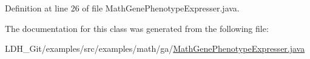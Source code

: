 Definition at line 26 of file Math\-Gene\-Phenotype\-Expresser.\-java.



The documentation for this class was generated from the following file\-:\begin{DoxyCompactItemize}
\item 
L\-D\-H\-\_\-\-Git/examples/src/examples/math/ga/\hyperlink{_math_gene_phenotype_expresser_8java}{Math\-Gene\-Phenotype\-Expresser.\-java}\end{DoxyCompactItemize}

